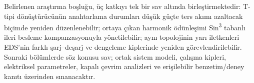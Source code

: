 Belirlenen araştırma boşluğu, üç katkıyı tek bir sav altında birleştirmektedir: T-tipi dönüştürücünün anahtarlama durumları düşük güçte ters akımı azaltacak biçimde yeniden düzenlenebilir; ortaya çıkan harmonik ödünleşimi Sin\textsuperscript{3} tabanlı ileri besleme kompanzasyonuyla yönetilebilir; aynı topolojinin yarı iletkenleri EDS'nin farklı şarj--deşarj ve dengeleme kiplerinde yeniden görevlendirilebilir. Sonraki bölümlerde söz konusu sav; ortak sistem modeli, çalışma kipleri, elektriksel parametreler, kapalı çevrim analizleri ve erişilebilir benzetim/deney kanıtı üzerinden sınanacaktır.

